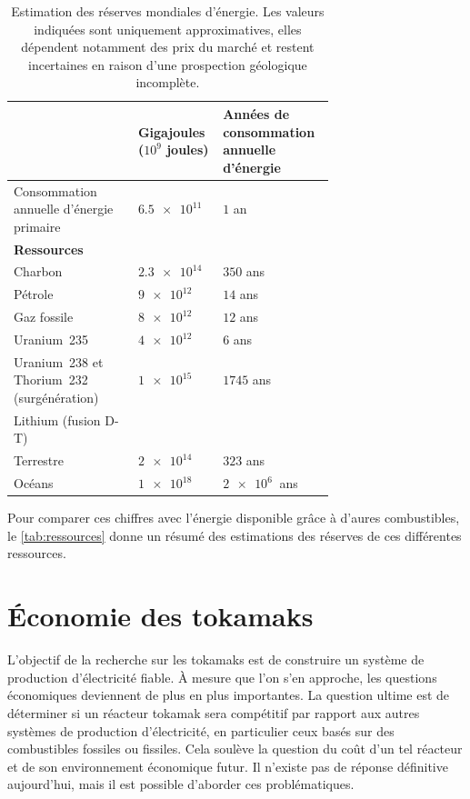 \documentclass[main.tex]{subfiles}
\begin{document}
\begin{table}

	\centering

	\caption{Estimation des réserves mondiales d’énergie. Les valeurs indiquées sont uniquement approximatives, elles dépendent notamment des prix du marché et restent incertaines en raison d’une prospection géologique incomplète.}

	\begin{tabular}{>{\raggedright\arraybackslash}p{0.35\linewidth} >{\raggedleft\arraybackslash}p{0.15\linewidth} >{\raggedright\arraybackslash}p{0.2\linewidth}}
	\hline
	& Gigajoules (\( 10^9 \) joules) & Années de consommation annuelle d'énergie\\
	\hline
	Consommation annuelle d'énergie primaire & \( \SI{6.5e11}{} \) & \( 1 \) an\\
	\textbf{Ressources} & & \\
	Charbon & \( \SI{2.3e14}{} \) & \( 350 \) ans  \\
	Pétrole & \( \SI{9e12}{} \)  & \( 14 \) ans \\
	Gaz fossile & \( \SI{8e12}{} \)  & \( 12 \) ans  \\
	Uranium~235 & \( \SI{4e12}{} \)  & \( 6 \) ans  \\
	Uranium~238 et Thorium~232 (surgénération) & \( \SI{1e15}{} \)   & \( 1745 \) ans  \\
	Lithium (fusion D-T) &  &   \\
	 \quad Terrestre & \( \SI{2e14}{} \)  & \( 323 \) ans  \\
	 \quad Océans & \( \SI{1e18}{} \)  & \( \SI{2e6}{} \) ans  \\	
	\end{tabular}
	
	\label{tab:ressources}

\end{table}

Pour comparer ces chiffres avec l'énergie disponible grâce à d'aures combustibles, le \autoref{tab:ressources} donne un résumé des estimations des réserves de ces différentes ressources.

\FloatBarrier
\section{Économie des tokamaks}
\label{sec:economie_tokamak}

L’objectif de la recherche sur les tokamaks est de construire un système de production d’électricité fiable. 
À mesure que l’on s’en approche, les questions économiques deviennent de plus en plus importantes.
La question ultime est de déterminer si un réacteur tokamak sera compétitif par rapport aux autres systèmes de production d’électricité, en particulier ceux basés sur des combustibles fossiles ou fissiles. 
Cela soulève la question du coût d’un tel réacteur et de son environnement économique futur.
Il n’existe pas de réponse définitive aujourd’hui, mais il est possible d’aborder ces problématiques.
\end{document}
